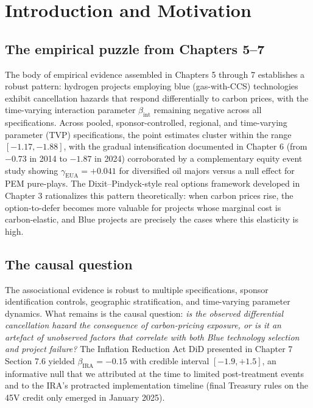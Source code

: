 \documentclass[11pt,a4paper]{article}
\newcommand{\bint}{\beta_{\mathrm{int}}}
\begin{document}
\tableofcontents
\newpage

\section{Introduction and Motivation}
\label{sec:ch8-intro}

\subsection{The empirical puzzle from Chapters 5--7}

The body of empirical evidence assembled in Chapters 5 through 7 establishes a robust pattern: hydrogen projects employing blue (gas-with-CCS) technologies exhibit cancellation hazards that respond differentially to carbon prices, with the time-varying interaction parameter $\bint$ remaining negative across all specifications. Across pooled, sponsor-controlled, regional, and time-varying parameter (TVP) specifications, the point estimates cluster within the range $[-1.17, -1.88]$, with the gradual intensification documented in Chapter 6 (from $-0.73$ in 2014 to $-1.87$ in 2024) corroborated by a complementary equity event study showing $\gamma_{\mathrm{EUA}} = +0.041$ for diversified oil majors versus a null effect for PEM pure-plays. The Dixit--Pindyck-style real options framework developed in Chapter 3 rationalizes this pattern theoretically: when carbon prices rise, the option-to-defer becomes more valuable for projects whose marginal cost is carbon-elastic, and Blue projects are precisely the cases where this elasticity is high.

\subsection{The causal question}

The associational evidence is robust to multiple specifications, sponsor identification controls, geographic stratification, and time-varying parameter dynamics. What remains is the causal question: \emph{is the observed differential cancellation hazard the consequence of carbon-pricing exposure, or is it an artefact of unobserved factors that correlate with both Blue technology selection and project failure?} The Inflation Reduction Act DiD presented in Chapter 7 Section 7.6 yielded $\beta_{\mathrm{IRA}} = -0.15$ with credible interval $[-1.9, +1.5]$, an informative null that we attributed at the time to limited post-treatment events and to the IRA's protracted implementation timeline (final Treasury rules on the 45V credit only emerged in January 2025).
\end{document}
